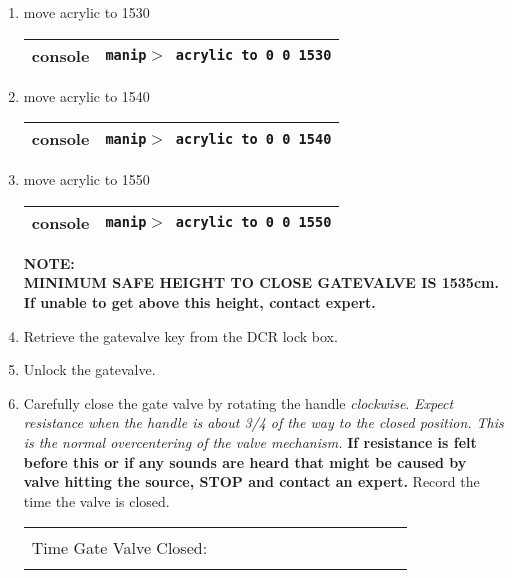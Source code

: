 \begin{enumerate}
\begin{center}
           {\bf Retracting source above gate valve.  Side ropes NOT attached.}
\end{center}
\item\checkbox move acrylic to 1530
  \begin{center}
  \begin{tabular}{|l|l|}
  \hline
  console & {\tt manip$>$ acrylic to 0 0 1530} \\
  \hline
  \end{tabular}
  \end{center}
\item\checkbox move acrylic to 1540
  \begin{center}
  \begin{tabular}{|l|l|}
  \hline
  console & {\tt manip$>$ acrylic to 0 0 1540} \\
  \hline
  \end{tabular}
  \end{center}
\item\checkbox move acrylic to 1550
  \begin{center}
  \begin{tabular}{|l|l|}
  \hline
  console & {\tt manip$>$ acrylic to 0 0 1550} \\
  \hline
  \end{tabular}
  \end{center}
{\bf
 NOTE:\\
   MINIMUM SAFE HEIGHT TO CLOSE GATEVALVE IS 1535cm.\\
   If unable to get above this height, contact expert.
}
\item\checkbox Retrieve the gatevalve key from the DCR lock box.
\item\checkbox Unlock the gatevalve.
\item\checkbox Carefully close the gate valve by rotating the handle {\em clockwise}.
  {\em Expect resistance when the handle is about 3/4 of the way to
  the closed position.  This is the normal overcentering of the
  valve mechanism.} {\bf If resistance is felt before this or
  if any sounds are heard that might be caused by valve hitting the source,
  STOP and contact an expert.}
  Record the time the valve is closed.
     \begin{center}
     \begin{tabular}{|l|}
     \hline
      \\
     Time Gate Valve Closed:~~~~~~~~~~~~~~~~~~~~~~~~\\
      \\
     \hline
     \end{tabular}
     \end{center}


\end{enumerate}
